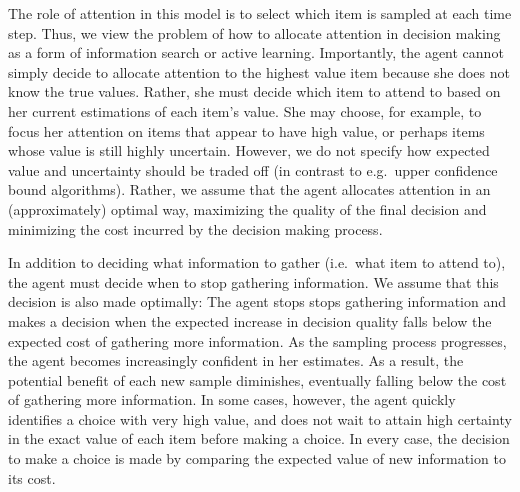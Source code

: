 \documentclass[12pt,a4paperpaper,]{article}
\begin{document}
The role of attention in this model is to select which item is sampled at each time step. Thus, we view the problem of how to allocate attention in decision making as a form of information search or active learning. Importantly, the agent cannot simply decide to allocate attention to the highest value item because she does not know the true values. Rather, she must decide which item to attend to based on her current estimations of each item's value. She may choose, for example, to focus her attention on items that appear to have high value, or perhaps items whose value is still highly uncertain. However, we do not specify how expected value and uncertainty should be traded off (in contrast to e.g.~upper confidence bound algorithms). Rather, we assume that the agent allocates attention in an (approximately) optimal way, maximizing the quality of the final decision and minimizing the cost incurred by the decision making process.

In addition to deciding what information to gather (i.e.~what item to attend to), the agent must decide when to stop gathering information. We assume that this decision is also made optimally: The agent stops stops gathering information and makes a decision when the expected increase in decision quality falls below the expected cost of gathering more information. As the sampling process progresses, the agent becomes increasingly confident in her estimates. As a result, the potential benefit of each new sample diminishes, eventually falling below the cost of gathering more information. In some cases, however, the agent quickly identifies a choice with very high value, and does not wait to attain high certainty in the exact value of each item before making a choice. In every case, the decision to make a choice is made by comparing the expected value of new information to its cost.
\end{document}

